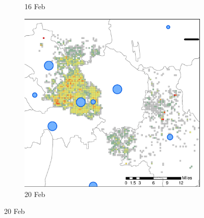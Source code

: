 \documentclass[preprints,ijgi,submit,moreauthors]{Definitions/mdpi}
\begin{document}
\begin{figure}[H]
\begin{subfigure}{.3\textwidth}
        \caption{16 Feb}
    \end{subfigure}
    \begin{subfigure}{.3\textwidth}
        \includegraphics[width=\textwidth]{Figures/Relation_with_confrimed_cases/NewDistrictSSBD2020_02_20.eps}
        \caption{20 Feb}
    \end{subfigure}
    

\end{figure}
\end{document}
